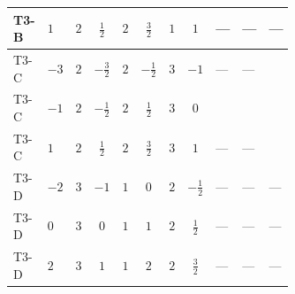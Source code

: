 \documentclass[8pt]{article}
\begin{document}
\begin{landscape}
\begin{longtable}{@{}llcccccc >{\raggedright\arraybackslash}p{0.21\linewidth} >{\raggedright\arraybackslash}p{0.21\linewidth} >{\raggedright\arraybackslash}p{0.21\linewidth}@{}}
\midrule
T3-B & $1$ & $2$ & $\frac{1}{2}$ & $2$ & $\frac{3}{2}$ & $1$ & $1$ & --- & --- & --- \\
\midrule
T3-C & $-3$ & $2$ & $-\frac{3}{2}$ & $2$ & $-\frac{1}{2}$ & $3$ & $-1$ & --- & --- & \scriptsize\adjustbox{max width=\linewidth}{$\begin{gathered} {\lambda_{HS_1}^{(1)}} (3 T_{\nu}^{(1)}+6 \operatorname{Tr}\!\left({Y_d}\,\left({Y_d}\right)^{\dagger}\right)+2 \operatorname{Tr}\!\left({Y_e}\,\left({Y_e}\right)^{\dagger}\right)+6 \operatorname{Tr}\!\left({Y_u}\,\left({Y_u}\right)^{\dagger}\right))\end{gathered}$} \\
\midrule
T3-C & $-1$ & $2$ & $-\frac{1}{2}$ & $2$ & $\frac{1}{2}$ & $3$ & $0$ & \scriptsize\adjustbox{max width=\linewidth}{$\begin{gathered} +24 {\lambda_{7}} \left({\lambda_{7}}\right)^{*}\end{gathered}$} & \scriptsize\adjustbox{max width=\linewidth}{$\begin{gathered} +3 {\lambda_{11}} \left({\lambda_{H H^\dagger S_1^\dagger S_2^\dagger}^{\rm Cross}}\right)^{*}\end{gathered}$} & \scriptsize\adjustbox{max width=\linewidth}{$\begin{gathered} {\lambda_{HS_1}^{(1)}} (3 T_{\nu}^{(1)}+6 \operatorname{Tr}\!\left({Y_d}\,\left({Y_d}\right)^{\dagger}\right)+2 \operatorname{Tr}\!\left({Y_e}\,\left({Y_e}\right)^{\dagger}\right)+6 \operatorname{Tr}\!\left({Y_u}\,\left({Y_u}\right)^{\dagger}\right))\end{gathered}$} \\
\midrule
T3-C & $1$ & $2$ & $\frac{1}{2}$ & $2$ & $\frac{3}{2}$ & $3$ & $1$ & --- & --- & \scriptsize\adjustbox{max width=\linewidth}{$\begin{gathered} {\lambda_{HS_1}^{(1)}} (3 T_{\nu}^{(1)}+6 \operatorname{Tr}\!\left({Y_d}\,\left({Y_d}\right)^{\dagger}\right)+2 \operatorname{Tr}\!\left({Y_e}\,\left({Y_e}\right)^{\dagger}\right)+6 \operatorname{Tr}\!\left({Y_u}\,\left({Y_u}\right)^{\dagger}\right))\end{gathered}$} \\
\midrule
T3-D & $-2$ & $3$ & $-1$ & $1$ & $0$ & $2$ & $-\frac{1}{2}$ & --- & --- & --- \\
\midrule
T3-D & $0$ & $3$ & $0$ & $1$ & $1$ & $2$ & $\frac{1}{2}$ & --- & --- & --- \\
\midrule
T3-D & $2$ & $3$ & $1$ & $1$ & $2$ & $2$ & $\frac{3}{2}$ & --- & --- & --- \\

\end{longtable}
\end{landscape}
\end{document}
